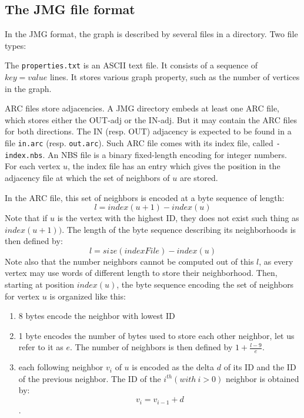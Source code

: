 \documentclass[11pt,a4paper]{article}
\begin{document}
\subsection{The JMG file format}
In the JMG format, the graph is described by several files in a directory. Two file types:

The \texttt{properties.txt}  is an ASCII text file. It consists of a sequence of $key=value$ lines. It stores various graph property, such as the number of vertices in the graph.

ARC files store adjacencies. A JMG directory embeds at least one ARC file, which stores either the OUT-adj or the IN-adj. But it may contain the ARC files for both directions.
The IN (resp. OUT) adjacency is expected to be found in a file \texttt{in.arc} (resp. \texttt{out.arc}). Such ARC file comes with its index file, called \texttt{-index.nbs}. An NBS file is a binary fixed-length encoding for integer numbers.
For each vertex $u$, the index file has an entry which gives the position in the adjacency file at which the set of neighbors of $u$ are stored.

In the ARC file, this set of neighbors is encoded at a byte sequence of length:
$$l = index(u+1) - index(u)$$
 Note that if $u$ is the vertex with the highest ID,  they does not exist such thing as $index(u+1))$. The length of the byte sequence describing its neighborhoods is then defined by:
 $$l = size(indexFile) - index(u)$$
Note also that the number neighbors cannot be computed out of this $l$, as every vertex may use words of different length to store their neighborhood.
Then, starting at position $index(u)$, the byte sequence encoding the set of neighbors for vertex $u$ is organized like this:
\begin{enumerate}
\item 8 bytes encode the neighbor with lowest ID
\item 1 byte encodes the number of bytes used to store each other neighbor, let us refer to it as $e$. The number of neighbors is then defined by $1 + \frac{l - 9}{e}$.
\item each following neighbor $v_i$ of $u$ is encoded as the delta $d$ of its ID and the ID of the previous neighbor.
The ID of the $i^{th} (with\ i > 0)$ neighbor is obtained by:
$$v_i = v_{i-1} + d$$.
\end{enumerate}
\end{document}
